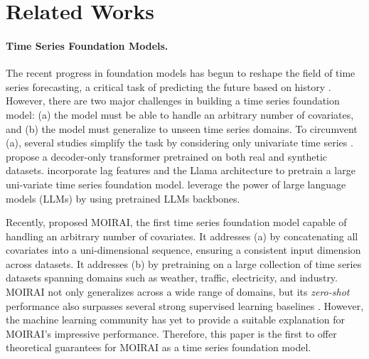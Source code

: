 \section{Related Works}\label{sec:related-work}

\paragraph{Time Series Foundation Models.}
The recent progress in foundation models \cite{touvron2023llama, brown2020language, rai2024strategies} has begun to reshape the field of time series forecasting, a critical task of predicting the future based on history \cite{hamilton2020time}.
However, there are two major challenges in building a time series foundation model:
(a) the model must be able to handle an arbitrary number of covariates, and
(b) the model must generalize to unseen time series domains.
To circumvent (a), several studies simplify the task by considering only univariate time series \cite{ansari2024chronos, rasul2023lag, das2023decoder}.
\cite{das2023decoder} propose a decoder-only transformer pretrained on both real and synthetic datasets.
\cite{rasul2023lag} incorporate lag features and the Llama architecture to pretrain a large uni-variate time series foundation model.
\cite{ansari2024chronos} leverage the power of large language models (LLMs) by using pretrained LLMs backbones.


Recently, \cite{woo2024unified} proposed MOIRAI, the first time series foundation model capable of handling an arbitrary number of covariates.
It addresses (a) by concatenating all covariates into a uni-dimensional sequence, ensuring a consistent input dimension across datasets.
It addresses (b) by pretraining on a large collection of time series datasets \cite{godahewa2021monash, alexandrov2020gluonts, wu2021autoformer, lai2018modeling} spanning domains such as weather, traffic, electricity, and industry.
MOIRAI not only generalizes across a wide range of domains, but its \emph{zero-shot} performance also surpasses several strong supervised learning baselines \cite{liu2023itransformer, nie2022time, zhang2023crossformer}.
However, the machine learning community has yet to provide a suitable explanation for MOIRAI’s impressive performance.
Therefore, this paper is the first to offer theoretical guarantees for MOIRAI as a time series foundation model.



